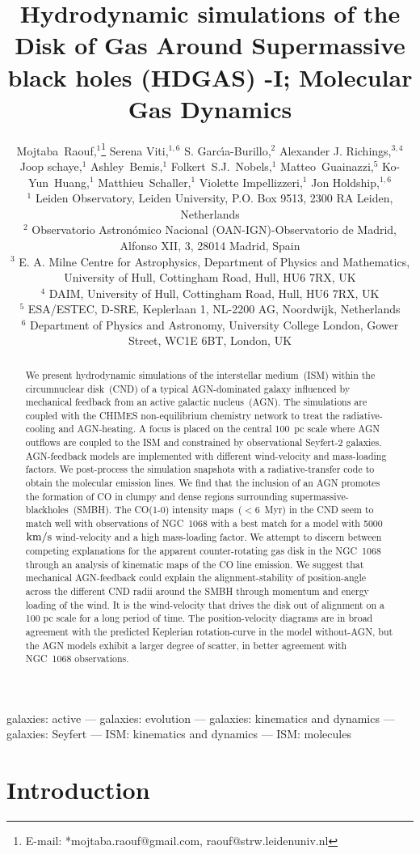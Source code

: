 \documentclass[fleqn,usenatbib]{mnras}
\title[HDGAS; Molecular Gas Dynamics]{Hydrodynamic simulations of the Disk of Gas Around Supermassive black holes (HDGAS) -I; Molecular Gas Dynamics}
\author[M. Raouf et al.]{
Mojtaba~Raouf,$^{1}$\thanks{E-mail: *mojtaba.raouf@gmail.com, raouf@strw.leidenuniv.nl} 
 Serena Viti,$^{1,6}$ 
 S. Garc{\'\i}a-Burillo,$^{2}$
 Alexander J. Richings,$^{3,4}$
  \newauthor
 Joop schaye,$^{1}$
 Ashley~Bemis,$^{1}$
 Folkert~S.J.~Nobels,$^{1}$
 Matteo~Guainazzi,$^{5}$
 Ko-Yun~Huang,$^{1}$
 \newauthor
 Matthieu~Schaller,$^{1}$
 Violette Impellizzeri,$^{1}$
 Jon Holdship,$^{1,6}$\\
$^{1}$ Leiden Observatory, Leiden University, P.O. Box 9513, 2300 RA Leiden, Netherlands\\
$^{2}$ Observatorio Astronómico Nacional (OAN-IGN)-Observatorio de Madrid, Alfonso XII, 3, 28014 Madrid, Spain\\
$^{3}$ E. A. Milne Centre for Astrophysics, Department of Physics and Mathematics, University of Hull, Cottingham Road, Hull, HU6 7RX, UK\\
$^{4}$ DAIM, University of Hull, Cottingham Road, Hull, HU6 7RX, UK\\
$^{5}$ ESA/ESTEC, D-SRE, Keplerlaan 1, NL-2200 AG, Noordwijk, Netherlands\\
$^{6}$ Department of Physics and Astronomy, University College London, Gower Street, WC1E 6BT, London, UK\\
}
\begin{document}
\label{firstpage}
\pagerange{\pageref{firstpage}--\pageref{lastpage}}
\maketitle
\begin{abstract}
We present hydrodynamic simulations of the interstellar medium~(ISM) within the circumnuclear disk~(CND) of a typical AGN-dominated galaxy influenced by mechanical feedback from an active galactic nucleus~(AGN). The simulations are coupled with the CHIMES non-equilibrium chemistry network to treat the radiative-cooling and AGN-heating. A focus is placed on the central 100~pc scale where AGN outflows are coupled to the ISM and constrained by observational Seyfert-2 galaxies. AGN-feedback models are implemented with different wind-velocity and mass-loading factors. We post-process the simulation snapshots with a radiative-transfer code to obtain the molecular emission lines. We find that the inclusion of an AGN promotes the formation of CO in clumpy and dense regions surrounding supermassive-blackholes~(SMBH). The CO(1-0) intensity maps~($<$6~Myr) in the CND seem to match well with observations of NGC~1068 with a best match for a model with 5000~$\rm km/s$ wind-velocity and a high mass-loading factor.  We attempt to discern between competing explanations for the apparent counter-rotating gas disk in the NGC~1068 through an analysis of kinematic maps of the CO line emission.  We suggest that mechanical AGN-feedback could explain the alignment-stability of position-angle across the different CND radii around the SMBH through momentum and energy loading of the wind. It is the wind-velocity that drives the disk out of alignment on a 100 pc scale for a long period of time. The position-velocity diagrams are in broad agreement with the predicted Keplerian rotation-curve in the model without-AGN, but the AGN models exhibit a larger degree of scatter, in better agreement with  NGC~1068 observations.


\end{abstract}

\begin{keywords}
galaxies: active — galaxies: evolution — galaxies: kinematics and dynamics — galaxies: Seyfert — ISM: kinematics and dynamics — ISM: molecules
\end{keywords}

\section{Introduction}
\end{document}
